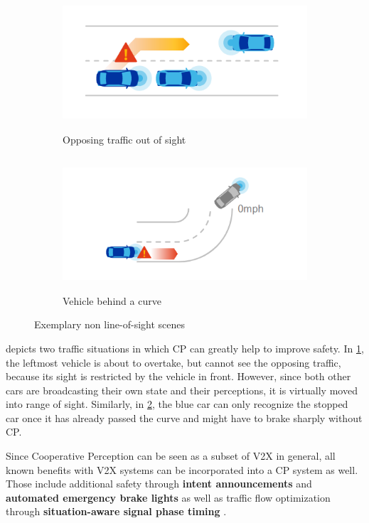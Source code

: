\begin{figure}[h]
	
	\begin{subfigure}{0.5\textwidth}
		\includegraphics[width=1.0\linewidth, height=5cm]{98_images/nloss_2.png} 
		\caption{Opposing traffic out of sight}
		\label{fig:cp_use_cases_1}
	\end{subfigure}
	\begin{subfigure}{0.5\textwidth}
		\includegraphics[width=1.2\linewidth, height=5cm]{98_images/nloss_3.png}
		\caption{Vehicle behind a curve}
		\label{fig:cp_use_cases_2}
	\end{subfigure}
	
	\caption[Exemplary non line-of-sight scenes]{Exemplary non line-of-sight scenes \cite{QualcommTechnologiesInc.2017}}
	\label{fig:cp_use_cases}
\end{figure}

 depicts two traffic situations in which CP can greatly help to improve safety. In \cref{fig:cp_use_cases_1}, the leftmost vehicle is about to overtake, but cannot see the opposing traffic, because its sight is restricted by the vehicle in front. However, since both other cars are broadcasting their own state and their perceptions, it is virtually moved into range of sight. Similarly, in \cref{fig:cp_use_cases_2}, the blue car can only recognize the stopped car once it has already passed the curve and might have to brake sharply without CP.

Since Cooperative Perception can be seen as a subset of V2X in general, all known benefits with V2X systems can be incorporated into a CP system as well. Those include additional safety through \textbf{intent announcements} and \textbf{automated emergency brake lights} as well as traffic flow optimization through \textbf{situation-aware signal phase timing} \cite{5GAutomotiveAssociation2019b}.

